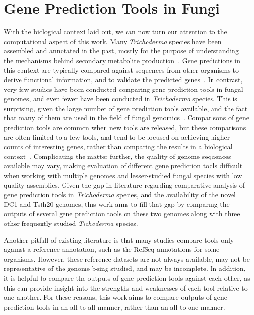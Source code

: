 \section{Gene Prediction Tools in Fungi}
\label{lit:comp-motiv}
With the biological context laid out, we can now turn our attention to the computational aspect of this work. Many \textit{Trichoderma} species have been assembled and annotated in the past, mostly for the purpose of understanding the mechanisms behind secondary metabolite production~\cite{Mukherjee2012}. Gene predictions in this context are typically compared against sequences from other organisms to derive functional information, and to validate the predicted genes~\cite{loftus2003a}. In contrast, very few studies have been conducted comparing gene prediction tools in fungal genomes, and even fewer have been conducted in \textit{Trichoderma} species. This is surprising, given the large number of gene prediction tools available, and the fact that many of them are used in the field of fungal genomics~\cite{ejigu2020a}. Comparisons of gene prediction tools are common when new tools are released, but these comparisons are often limited to a few tools, and tend to be focused on achieving higher counts of interesting genes, rather than comparing the results in a biological context~\cite{min2017}. Complicating the matter further, the quality of genome sequences available may vary, making evaluation of different gene prediction tools difficult when working with multiple genomes and lesser-studied fungal species with low quality assemblies. Given the gap in literature regarding comparative analysis of gene prediction tools in \textit{Trichoderma} species, and the availability of the novel DC1 and Tsth20 genomes, this work aims to fill that gap by comparing the outputs of several gene prediction tools on these two genomes along with three other frequently studied \textit{Tichoderma} species. 

Another pitfall of existing literature is that many studies compare tools only against a reference annotation, such as the RefSeq annotations for some organisms. However, these reference datasets are not always available, may not be representative of the genome being studied, and may be incomplete. In addition, it is helpful to compare the outputs of gene prediction tools against each other, as this can provide insight into the strengths and weaknesses of each tool relative to one another. For these reasons, this work aims to compare outputs of gene prediction tools in an all-to-all manner, rather than an all-to-one manner.

